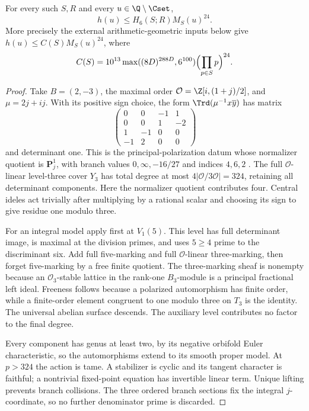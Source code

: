 \begin{theorem}\label{thm:height}
For every such $S,R$ and every $u\in\Q\setminus\Cset$,
\[
 h(u)\le H_6(S;R)M_S(u)^{24}.
\]
More precisely the external arithmetic-geometric inputs below give
$h(u)\le C(S)M_S(u)^{24}$, where
\[
 C(S)=10^{13}\max((8D)^{288D},6^{100})\Bigl(\prod_{p\in S}p\Bigr)^{24}.
\]
\end{theorem}
\begin{proof}
Take $B=(2,-3)$, the maximal order $\mathcal O=\Z[i,(1+j)/2]$, and
$\mu=2j+ij$. With its positive sign choice, the form
$\Trd(\mu^{-1}x\overline y)$ has matrix
\[
 \begin{pmatrix}0&0&-1&1\\0&0&1&-2\\1&-1&0&0\\-1&2&0&0\end{pmatrix}
\]
and determinant one. This is the principal-polarization datum whose
normalizer quotient is $\mathbf P^1_j$, with branch values
$0,\infty,-16/27$ and indices $4,6,2$ \cite{babagranath,linyang}.
The full $\mathcal O$-linear level-three cover $Y_3$ has total degree
at most $4|\mathcal O/3\mathcal O|=324$, retaining all determinant
components. Here the normalizer quotient contributes four. Central
ideles act trivially after multiplying by a rational scalar and choosing
its sign to give residue one modulo three.

For an integral model apply \cite[Theorem 2.1, Corollary 2.3]{buzzard}
first at $V_1(5)$. This level has full determinant image, is maximal at
the division primes, and uses $5\ge4$ prime to the discriminant six.
Add full five-marking and full $\mathcal O$-linear three-marking, then
forget five-marking by a free finite quotient. The three-marking sheaf
is nonempty because an $\mathcal O_3$-stable lattice in the rank-one
$B_3$-module is a principal fractional left ideal. Freeness follows
because a polarized automorphism has finite order, while a finite-order
element congruent to one modulo three on $T_3$ is the identity.
The universal abelian surface descends. The auxiliary level contributes
no factor to the final degree.

Every component has genus at least two, by its negative orbifold Euler
characteristic, so the automorphisms extend to its smooth proper model.
At $p>324$ the action is tame. A stabilizer is cyclic and its tangent
character is faithful; a nontrivial fixed-point equation has invertible
linear term. Unique lifting prevents branch collisions. The three
ordered branch sections fix the integral $j$-coordinate, so no further
denominator prime is discarded.


\end{proof}
